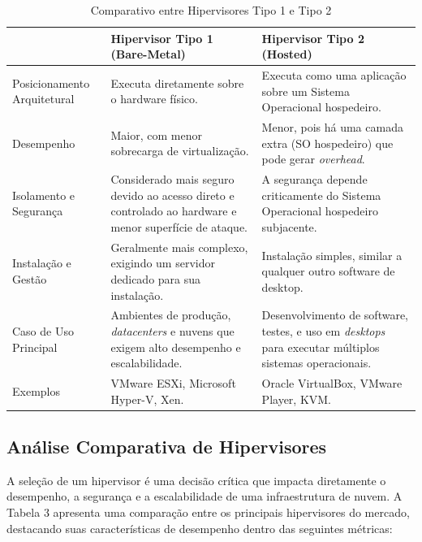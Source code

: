 \begin{table}[h]
    \centering
    \caption{Comparativo entre Hipervisores Tipo 1 e Tipo 2}
    \label{tab:comparativo_hipervisores}
    \begin{tabular}{|l|l|l|}
        \hline
        & \textbf{Hipervisor Tipo 1 (Bare-Metal)} & \textbf{Hipervisor Tipo 2 (Hosted)} \\
        \hline
        Posicionamento Arquitetural & Executa diretamente sobre o hardware físico. & Executa como uma aplicação sobre um Sistema Operacional hospedeiro. \\
        \hline
        Desempenho & Maior, com menor sobrecarga de virtualização. & Menor, pois há uma camada extra (SO hospedeiro) que pode gerar \textit{overhead}. \\
        \hline
        Isolamento e Segurança & Considerado mais seguro devido ao acesso direto e controlado ao hardware e menor superfície de ataque. & A segurança depende criticamente do Sistema Operacional hospedeiro subjacente. \\
        \hline
        Instalação e Gestão & Geralmente mais complexo, exigindo um servidor dedicado para sua instalação. & Instalação simples, similar a qualquer outro software de desktop. \\
        \hline
        Caso de Uso Principal & Ambientes de produção, \textit{datacenters} e nuvens que exigem alto desempenho e escalabilidade. & Desenvolvimento de software, testes, e uso em \textit{desktops} para executar múltiplos sistemas operacionais. \\
        \hline
        Exemplos & VMware ESXi, Microsoft Hyper-V, Xen. & Oracle VirtualBox, VMware Player, KVM. \\
        \hline
    \end{tabular}
\end{table}


\subsection{Análise Comparativa de Hipervisores}
A seleção de um hipervisor é uma decisão crítica que impacta diretamente o desempenho, a segurança e a escalabilidade de uma infraestrutura de nuvem. A Tabela 3 apresenta uma comparação entre os principais hipervisores do mercado, destacando suas características de desempenho dentro das seguintes métricas:

